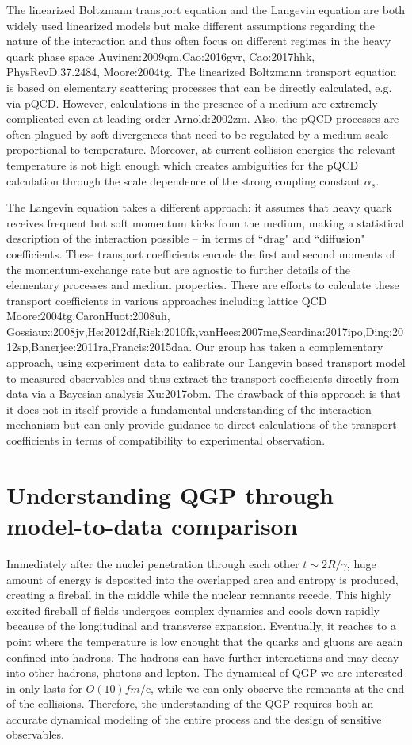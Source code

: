 The linearized Boltzmann transport equation and the Langevin equation are both widely used linearized models but make different assumptions regarding the nature of the interaction and thus often focus on different regimes in the heavy quark phase space {Auvinen:2009qm,Cao:2016gvr, Cao:2017hhk, PhysRevD.37.2484, Moore:2004tg}.
The linearized Boltzmann transport equation is based on elementary scattering processes that can be directly calculated, e.g. via pQCD.
However, calculations in the presence of a medium are extremely complicated even at leading order {Arnold:2002zm}.
Also, the pQCD processes are often plagued by soft divergences that need to be regulated by a medium scale proportional to temperature. Moreover, at current collision energies the relevant temperature is not high enough which creates ambiguities for the pQCD calculation through the scale dependence of the strong coupling constant $\alpha_s$.

The Langevin equation takes a different approach: 
it assumes that heavy quark receives frequent but soft momentum kicks from the medium, making a statistical description of the interaction possible -- in terms of ``drag" and ``diffusion" coefficients.
These transport coefficients encode the first and second moments of the momentum-exchange rate but are agnostic to further details of the elementary processes and medium properties.
There are efforts to calculate these transport coefficients in various approaches including lattice QCD {Moore:2004tg,CaronHuot:2008uh, Gossiaux:2008jv,He:2012df,Riek:2010fk,vanHees:2007me,Scardina:2017ipo,Ding:2012sp,Banerjee:2011ra,Francis:2015daa}. Our group has taken a complementary approach, using experiment data to calibrate our Langevin based transport model to measured observables and thus extract the transport coefficients directly from data via a Bayesian analysis {Xu:2017obm}. The drawback of this approach is that it does not in itself provide a fundamental understanding of the interaction mechanism but can only provide guidance to direct calculations of the transport coefficients in terms of compatibility to experimental observation.

\section{Understanding QGP through model-to-data comparison}
Immediately after the nuclei penetration through each other $t\sim 2R/\gamma$, huge amount of energy is deposited into the overlapped area and entropy is produced, creating a fireball in the middle while the nuclear remnants recede.
This highly excited fireball of fields undergoes complex dynamics and cools down rapidly because of the longitudinal and transverse expansion.
Eventually, it reaches to a point where the temperature is low enought that the quarks and gluons are again confined into hadrons. 
The hadrons can have further interactions and may decay into other hadrons, photons and lepton.
The dynamical of QGP we are interested in only lasts for $O(10) fm/$c, while we can only observe the remnants at the end of the collisions.
Therefore, the understanding of the QGP requires both an accurate dynamical modeling of the entire process and the design of sensitive observables.


